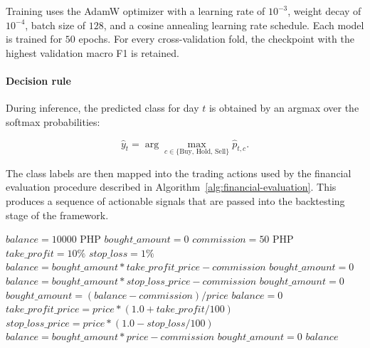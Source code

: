 \documentclass[12pt,a4paper]{article}
\begin{document}
Training uses the AdamW optimizer with a learning rate of $10^{-3}$, weight decay of $10^{-4}$, batch size of $128$, and a cosine annealing learning rate schedule. Each model is trained for $50$ epochs. For every cross-validation fold, the checkpoint with the highest validation macro F1 is retained.

\paragraph{Decision rule}

During inference, the predicted class for day $t$ is obtained by an argmax over the softmax probabilities:

\[
\hat{y}_t = \arg\max_{c \in \{\text{Buy, Hold, Sell}\}} \hat{p}_{t,c}.
\]

The class labels are then mapped into the trading actions used by the financial evaluation procedure described in Algorithm~\ref{alg:financial-evaluation}. This produces a sequence of actionable signals that are passed into the backtesting stage of the framework.



\begin{algorithm}[H]
	\footnotesize
	\caption{FinancialEvaluation}
	\label{alg:financial-evaluation}
	\begin{algorithmic}[1]
		\State $balance = 10000$ PHP
		\State $bought\_amount = 0$
		\State $commission = 50$ PHP
		\State $take\_profit = 10\%$
		\State $stop\_loss = 1\%$
		\State $balance = bought\_amount * take\_profit\_price - commission$
		\State $bought\_amount = 0$
		\EndIf
		\State $balance = bought\_amount * stop\_loss\_price - commission$
		\State $bought\_amount = 0$
		\EndIf
		\EndIf
		\State $bought\_amount = (balance - commission) / price$
		\State $balance = 0$
		\State $take\_profit\_price = price * (1.0 + take\_profit / 100)$
		\State $stop\_loss\_price = price * (1.0 - stop\_loss / 100)$
		\EndIf
		\State $balance = bought\_amount * price - commission$
		\State $bought\_amount = 0$
		\EndIf
		\EndFor
		\State \Return $balance$
		\EndProcedure
	\end{algorithmic}
\end{algorithm}
\end{document}
